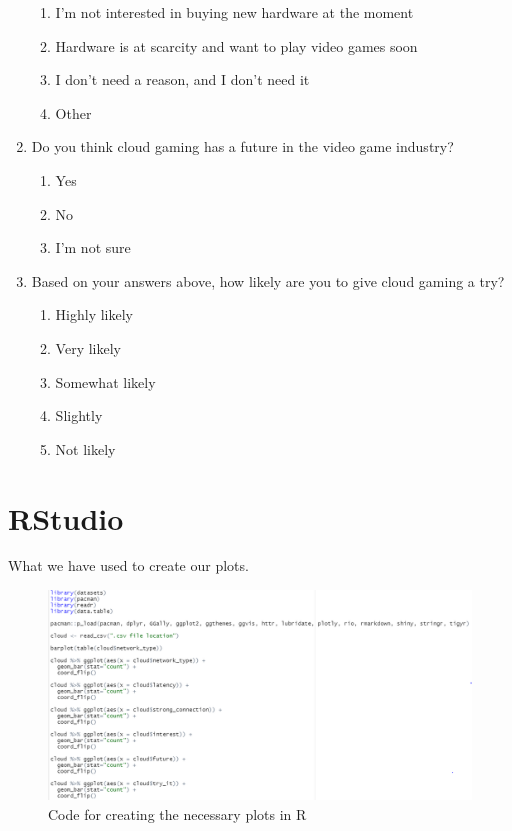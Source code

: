 \begin{enumerate}
\begin{enumerate}
		\item I'm not interested in buying new hardware at the moment
		\item Hardware is at scarcity and want to play video games soon
		\item I don't need a reason, and I don't need it
		\item Other
	\end{enumerate}
	\item Do you think cloud gaming has a future in the video game industry?
	\begin{enumerate}
		\item Yes
		\item No
		\item I'm not sure
	\end{enumerate}
	\item Based on your answers above, how likely are you to give cloud gaming a try?
	\begin{enumerate}
		\item Highly likely
		\item Very likely
		\item Somewhat likely
		\item Slightly
		\item Not likely
	\end{enumerate}
	
\end{enumerate}
\chapter{RStudio}
What we have used to create our plots.
\begin{figure}[H]
	\centering
	\includegraphics[width=16cm]{../img/R.png}
	\caption{Code for creating the necessary plots in R}
\end{figure}
